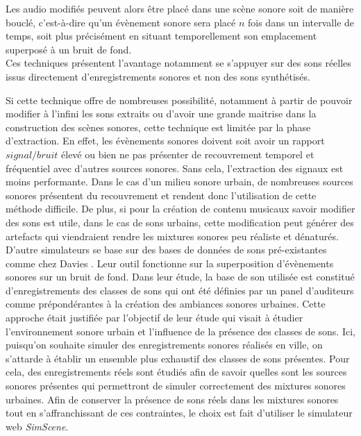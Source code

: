 Les audio modifiés peuvent alors être placé dans une scène sonore soit de manière bouclé, c'est-à-dire qu'un évènement sonore sera placé $n$ fois dans un intervalle de temps, soit plus précisément en situant temporellement son emplacement superposé à un bruit de fond.\\ 

Ces techniques présentent l'avantage notamment se s'appuyer sur des sons réelles issus directement d'enregistrements sonores et non des sons synthétisés. 

Si cette technique offre de nombreuses possibilité, notamment à partir de pouvoir modifier à l'infini les sons extraits ou d'avoir une grande maitrise dans la construction des scènes sonores, cette technique est limitée par la phase d'extraction. En effet, les évènements sonores doivent soit avoir un rapport $signal/bruit$ élevé ou bien ne pas présenter de recouvrement temporel et fréquentiel avec d'autres sources sonores. Sans cela, l'extraction des signaux est moins performante. Dans le cas d'un milieu sonore urbain, de nombreuses sources sonores présentent du recouvrement et rendent donc l'utilisation de cette méthode difficile. De plus, si pour la création de contenu musicaux savoir modifier des sons est utile, dans le cas de sons urbains, cette modification peut générer des artefacts qui viendraient rendre les mixtures sonores peu réaliste et dénaturés. \\

D'autre simulateurs se base sur des bases de données de sons pré-existantes comme chez Davies \cite{bruce_development_2009}. Leur outil fonctionne sur la superposition d'évènements sonores sur un bruit de fond. Dans leur étude, la base de son utilisée est constitué d'enregistrements des classes de sons qui ont été définies par un panel d'auditeurs comme prépondérantes à la création des ambiances sonores urbaines. Cette approche était justifiée par l'objectif de leur étude qui visait à étudier l'environnement sonore urbain et l'influence de la présence des classes de sons. Ici, puisqu'on souhaite simuler des enregistrements sonores réalisés en ville, on s'attarde à établir un ensemble plus exhaustif des classes de sons présentes. Pour cela, des enregistrements réels sont étudiés afin de savoir quelles sont les sources sonores présentes qui permettront de simuler correctement des mixtures sonores urbaines.
Afin de conserver la présence de sons réels dans les mixtures sonores tout en s'affranchissant de ces contraintes, le choix est fait d'utiliser le simulateur web \textit{SimScene}.

